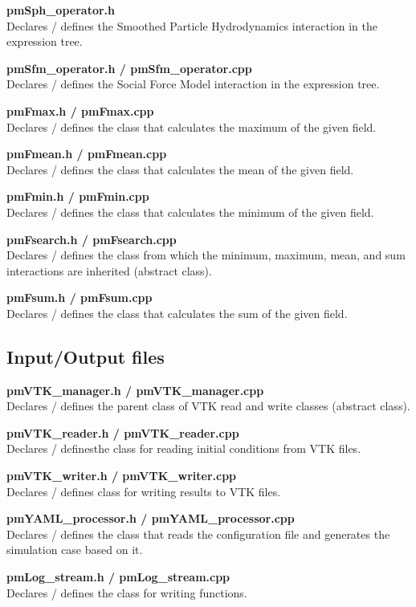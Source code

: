 \documentclass[a4paper,12pt,openany]{book}
\theoremstyle{break}
\begin{document}
\textbf{pmSph\_operator.h} \\
Declares / defines the Smoothed Particle Hydrodynamics interaction in the expression tree.

\textbf{pmSfm\_operator.h / pmSfm\_operator.cpp} \\
Declares / defines the Social Force Model interaction in the expression tree.

\textbf{pmFmax.h / pmFmax.cpp} \\
Declares / defines the class that calculates the maximum of the given field.

\textbf{pmFmean.h / pmFmean.cpp} \\
Declares / defines the class that calculates the mean of the given field.

\textbf{pmFmin.h / pmFmin.cpp} \\
Declares / defines the class that calculates the minimum of the given field.

\textbf{pmFsearch.h / pmFsearch.cpp} \\
Declares / defines the class from which the minimum, maximum, mean, and sum interactions are inherited (abstract class).

\textbf{pmFsum.h / pmFsum.cpp} \\
Declares / defines the class that calculates the sum of the given field.


\subsection{Input/Output files}

\textbf{pmVTK\_manager.h / pmVTK\_manager.cpp} \\
Declares / defines the parent class of VTK read and write classes (abstract class).

\textbf{pmVTK\_reader.h / pmVTK\_reader.cpp} \\
Declares / definesthe class for reading initial conditions from VTK files.

\textbf{pmVTK\_writer.h / pmVTK\_writer.cpp} \\
Declares / defines class for writing results to VTK files.

\textbf{pmYAML\_processor.h / pmYAML\_processor.cpp} \\
Declares / defines the class that reads the configuration file and generates the simulation case based on it.

\textbf{pmLog\_stream.h / pmLog\_stream.cpp} \\
Declares / defines the class for writing functions.
\end{document}
